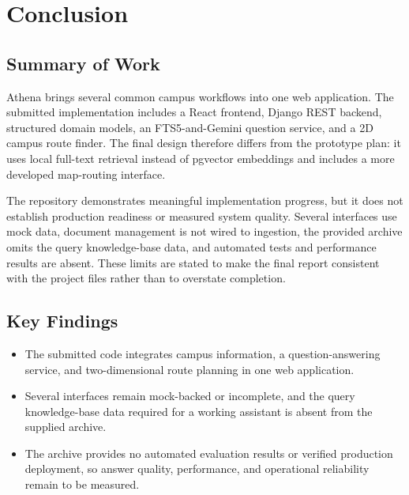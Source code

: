 \documentclass[11pt,a4paper]{report}
\begin{document}
\chapter{Conclusion}

\section{Summary of Work}
Athena brings several common campus workflows into one web application. The
submitted implementation includes a React frontend, Django REST backend,
structured domain models, an FTS5-and-Gemini question service, and a 2D campus
route finder. The final design therefore differs from the prototype plan: it
uses local full-text retrieval instead of pgvector embeddings and includes a
more developed map-routing interface.

The repository demonstrates meaningful implementation progress, but it does
not establish production readiness or measured system quality. Several
interfaces use mock data, document management is not wired to ingestion, the
provided archive omits the query knowledge-base data, and automated tests and
performance results are absent. These limits are stated to make the final
report consistent with the project files rather than to overstate completion.

\section{Key Findings}
\begin{itemize}[leftmargin=*]
  \item The submitted code integrates campus information, a question-answering
    service, and two-dimensional route planning in one web application.
  \item Several interfaces remain mock-backed or incomplete, and the query
    knowledge-base data required for a working assistant is absent from the
    supplied archive.
  \item The archive provides no automated evaluation results or verified
    production deployment, so answer quality, performance, and operational
    reliability remain to be measured.
\end{itemize}
\end{document}
